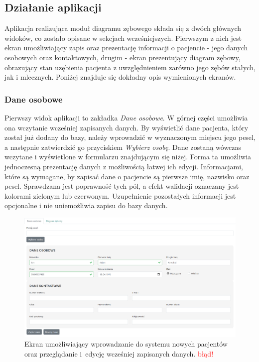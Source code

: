 \subsection{Działanie aplikacji}

Aplikacja realizująca moduł diagramu zębowego składa się z dwóch głównych widoków, co zostało opisane w sekcjach wcześniejszych. Pierwszym z nich jest ekran umożliwiający zapis oraz prezentację informacji o pacjencie - jego danych osobowych oraz kontaktowych, drugim - ekran prezentujący diagram zębowy, obrazujący stan uzębienia pacjenta z uwzględnieniem zarówno jego zębów stałych, jak i mlecznych. Poniżej znajduje się dokładny opis wymienionych ekranów.

\subsubsection{Dane osobowe}

Pierwszy widok aplikacji to zakładka \textit{Dane osobowe}. W górnej części umożliwia ona wczytanie wcześniej zapisanych danych. By wyświetlić dane pacjenta, który został już dodany do bazy, należy wprowadzić w wyznaczonym miejscu jego pesel, a następnie zatwierdzić go przyciskiem \textit{Wybierz osobę}. Dane zostaną wówczas wczytane i wyświetlone w formularzu znajdującym się niżej. Forma ta umożliwia jednoczesną prezentację danych z możliwością łatwej ich edycji. Informacjami, które są wymagane, by zapisać dane o pacjencie są pierwsze imię, nazwisko oraz pesel. Sprawdzana jest poprawność tych pól, a efekt walidacji oznaczany jest kolorami zielonym lub czerwonym. Uzupełnienie pozostałych informacji jest opcjonalne i nie uniemożliwia zapisu do bazy danych.

\begin{figure}[ht!]
\centering\includegraphics[width=\textwidth]{figures/fromularz.PNG}
\caption{Ekran umożliwiający wprowadzanie do systemu nowych pacjentów oraz przeglądanie i~edycję wcześniej zapisanych danych. \textcolor{red}{błąd!}}
\label{fig:examleForm}
\end{figure}


